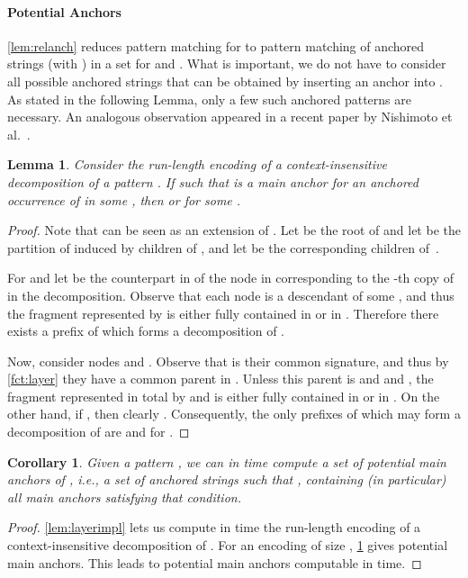 \documentclass[a4paper]{article}
\newtheorem{lemma}[theorem]{Lemma}
\newtheorem{corollary}[theorem]{Corollary}
\theoremstyle{remark}
\begin{document}
\paragraph{Potential Anchors}
\cref{lem:relanch} reduces pattern matching for  to pattern matching of anchored strings  (with )
in a set  for  and . What is important, we do not have to consider all  possible anchored strings that can be obtained by inserting an anchor into .
As stated in the following Lemma, only a few such anchored patterns are necessary.
An analogous observation appeared in a recent paper by Nishimoto et al.~\cite{DBLP:journals/corr/NishimotoIIBT15}.


\begin{lemma}\label{lem:maina}
Consider the run-length encoding  of a context-insensitive decomposition  of a pattern .
If  such that  is a main anchor for an anchored occurrence of  in some , then  or  for some .
\end{lemma}
\begin{proof}
Note that  can be seen as an extension of .
Let  be the root of  and let  be the partition of  induced by children of , and let  be the corresponding children of~.


For  and  let  be the counterpart in  of the node
in  corresponding to the -th copy of  in the decomposition.
Observe that each node  is a descendant of some , and thus the fragment represented by 
is either fully contained in  or in .
Therefore there exists a prefix of  which forms a decomposition of .

Now, consider nodes  and . Observe that  is their common signature, and thus by \cref{fct:layer} they have a common parent in .
Unless this parent is  and  and , the fragment represented in total by  and  is either
fully contained in  or in .
On the other hand, if , then clearly .
Consequently, the only prefixes of  which may form a decomposition of  are  and 
for  .
\end{proof}
\begin{corollary}\label{cor:maina}
Given a pattern , we can in  time compute a set of \emph{potential main anchors} of ,
i.e., a set of  anchored strings  such that , containing (in particular) all main anchors satisfying that condition.
\end{corollary}
\begin{proof}
\cref{lem:layerimpl} lets us compute in  time the run-length encoding of a context-insensitive decomposition of .
For an encoding of size , \cref{lem:maina} gives  potential main anchors.
This leads to   potential main anchors computable in  time.
\end{proof}
\end{document}
